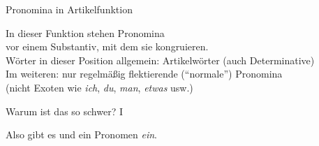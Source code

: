 \begin{frame}
  {Pronomina in Artikelfunktion}
  \pause
  \begin{exe}
    \ex \label{ex:gemeinsamkeitenundunterschiede074}
    \begin{xlist}
    \end{xlist}
  \end{exe}
  \pause
  \Zeile
  In dieser Funktion stehen Pronomina\\
  \alert{vor einem Substantiv, mit dem sie kongruieren}.\\
  \Zeile
  \pause
  Wörter in dieser Position allgemein: \alert{Artikelwörter} (auch Determinative)\\
  \Zeile
  \pause
  Im weiteren: nur regelmäßig flektierende ("`normale"') Pronomina\\
  (nicht Exoten wie \textit{ich}, \textit{du}, \textit{man}, \textit{etwas} usw.)
\end{frame}


\begin{frame}
  {Warum ist das so schwer? I}
  \pause
    \begin{center}
    \end{center}
    \pause
    \pause
    \Halbzeile
    Also gibt es  und \alert{ein Pronomen \textit{ein}}.
\end{frame}


